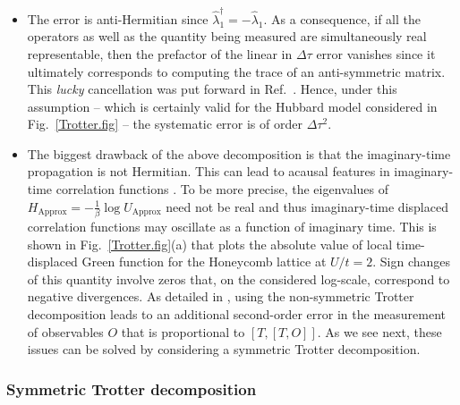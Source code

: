 \begin{itemize}
\item    The error is anti-Hermitian  since $\hat{\lambda}_1^{\dagger} = - \hat{\lambda}_1 $. As a consequence, if all the operators as well as the quantity being measured are simultaneously real representable,  then   the prefactor of the linear in $\Delta  \tau$ error vanishes since it ultimately corresponds to computing the trace of an  anti-symmetric matrix. This \textit{lucky}   cancellation was put forward in  Ref.~\cite{Fye86}.   Hence, under this assumption -- which is certainly valid for the Hubbard model considered in Fig.~\ref{Trotter.fig} -- the systematic error is of order $\Delta \tau^2$.
\item  The biggest drawback  of the above decomposition is that  the imaginary-time propagation is not Hermitian.   This can lead to acausal  features in imaginary-time correlation functions \cite{Beyl_thesis}. To be more precise, the eigenvalues of  
$  H_{\text{Approx}} = - \frac{1}{\beta} \log  U_{\text{Approx}}$ need not be real and thus imaginary-time displaced correlation functions may oscillate as a function of imaginary time.   
This is shown in  Fig.~\ref{Trotter.fig}(a)  that plots the  absolute value of local time-displaced Green function for  the Honeycomb lattice at $U/t=2$.  Sign changes of this quantity   involve zeros  that, on the considered log-scale,  correspond to negative divergences.
As detailed in \cite{goth2020}, using the non-symmetric Trotter decomposition 
leads to an additional second-order error in the measurement of observables $O$
that is proportional to $[T,[T,O]]$.
As we see next, these issues can be solved by considering a symmetric  Trotter decomposition.
\end{itemize}


\subsubsection{Symmetric Trotter decomposition} 

